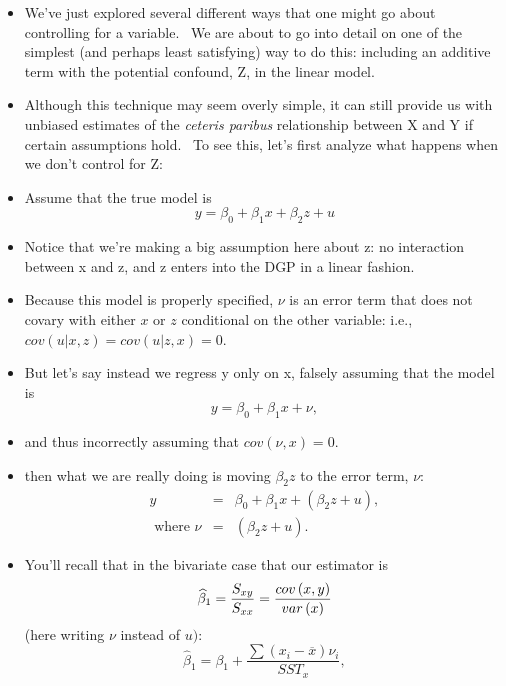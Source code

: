 \documentclass[11pt]{article}
\begin{document}
\begin{itemize}
\item We've just explored several different ways that one might go about
controlling for a variable. \ We are about to go into detail on one of the
simplest (and perhaps least satisfying) way to do this: including an
additive term with the potential confound, Z, in the linear model. \ 

\item Although this technique may seem overly simple, it can still provide
us with unbiased estimates of the \textit{ceteris paribus }relationship
between X and Y if certain assumptions hold. \ To see this, let's first
analyze what happens when we don't control for Z:

\item Assume that the true model is%
\begin{equation*}
y=\beta _{0}+\beta _{1}x+\beta _{2}z+u
\end{equation*}

\item Notice that we're making a big assumption here about z: no interaction
between x and z, and z enters into the DGP in a linear fashion.

\item Because this model is properly specified, $\nu $ is an error term that
does not covary with either $x$ or $z$ conditional on the other variable:
i.e., $cov\left( u|x,z\right) =cov\left( u|z,x\right) =0$.

\item But let's say instead we regress y only on x, falsely assuming that
the model is 
\begin{equation*}
y=\beta _{0}+\beta _{1}x+\nu ,
\end{equation*}

\item and thus incorrectly assuming that $cov\left( \nu ,x\right) =0.$

\item then what we are really doing is moving $\beta _{2}z$ to the error
term, $\nu :$%
\begin{eqnarray*}
y &=&\beta _{0}+\beta _{1}x+(\beta _{2}z+u)\mathbf{,} \\
\text{ where }\nu &=&(\beta _{2}z+u).
\end{eqnarray*}

\item You'll recall that in the bivariate case that our estimator is%
\begin{equation*}
\widehat{\beta }_{1}=\frac{S_{xy}}{S_{xx}}=\frac{cov\left( x,y\right) }{%
var\left( x\right) }
\end{equation*}%
(here writing $\nu $ instead of $u)$: 
\begin{equation*}
\widehat{\beta }_{1}=\beta _{1}+\frac{\sum \left( x_{i}-\overline{x}\right)
\nu _{i}}{SST_{x}},
\end{equation*}


\end{itemize}
\end{document}
